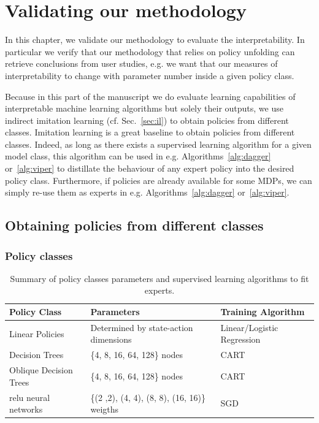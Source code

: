 \chapter{Validating our methodology}\label{sec:exps1}

In this chapter, we validate our methodology to evaluate the interpretability.
In particular we verify that our methodology that relies on policy unfolding can retrieve conclusions from user studies, e.g. we want that our measures of interpretability to change with parameter number inside a given policy class.

Because in this part of the manuscript we do evaluate learning capabilities of interpretable machine learning algorithms but solely their outputs, we use indirect imitation learning (cf. Sec.~\ref{sec:il}) to obtain policies from different classes.
Imitation learning is a great baseline to obtain policies from different classes.
Indeed, as long as there exists a supervised learning algorithm for a given model class, this algorithm can be used in e.g. Algorithms~\ref{alg:dagger} or~\ref{alg:viper} to distillate the behaviour of any expert policy into the desired policy class. 
Furthermore, if policies are already available for some MDPs, we can simply re-use them as experts in e.g. Algorithms~\ref{alg:dagger} or~\ref{alg:viper}.

\section{Obtaining policies from different classes}

\subsection{Policy classes}
\begin{table}[ht]
\centering
\small
\begin{tabular}{lll}
\hline
\textbf{Policy Class} & \textbf{Parameters} & \textbf{Training Algorithm} \\
\hline
Linear Policies & Determined by state-action dimensions & Linear/Logistic Regression \\
Decision Trees & \{4, 8, 16, 64, 128\} nodes & CART \\
Oblique Decision Trees & \{4, 8, 16, 64, 128\} nodes & CART \\
relu neural networks & \{(2 ,2), (4, 4), (8, 8), (16, 16)\} weigths & SGD \\
\hline
\end{tabular}
\caption{Summary of policy classes parameters and supervised learning algorithms to fit experts.}
\label{tab:policy-classes}
\end{table}

